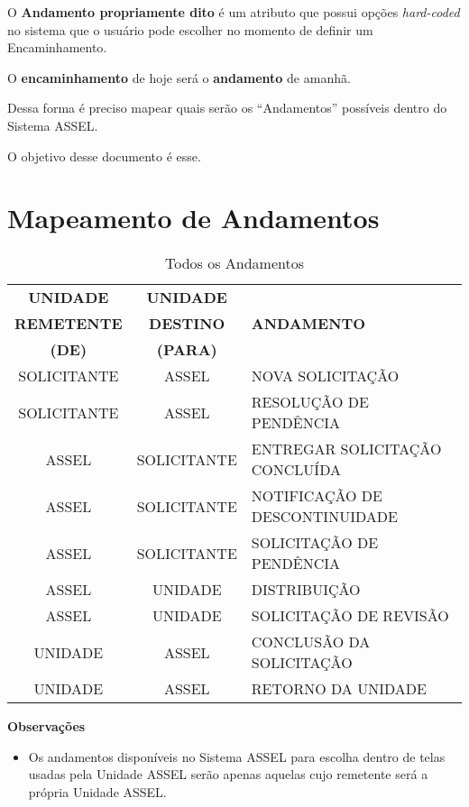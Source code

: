 O \textbf{Andamento propriamente dito} é um atributo que possui opções \emph{hard-coded} no sistema que o usuário pode escolher no momento de definir um Encaminhamento.

O \textbf{encaminhamento} de hoje será o \textbf{andamento} de amanhã.

Dessa forma é preciso mapear quais serão os ``Andamentos'' possíveis dentro do Sistema ASSEL.

O objetivo desse documento é esse.

\section{Mapeamento de Andamentos}

\begin{table}[h]
	\begin{center}
		\begin{tabular}{|c|c|p{}|}
			\hline
			\rowcolor{lightgray} \multicolumn{3}{|c|}{\Large Mapeamento de Andamentos \normalsize} \\ \hline \hline
			\rowcolor{lightgray}\textbf{UNIDADE} & \textbf{UNIDADE} &   \\ 
			\rowcolor{lightgray}\textbf{REMETENTE} & \textbf{DESTINO} & \textbf{ANDAMENTO} \\ 
			\rowcolor{lightgray}\textbf{(DE)} & \textbf{(PARA)} &  \\ \hline
			\rowcolor{corCOULD!10} SOLICITANTE & ASSEL & NOVA SOLICITAÇÃO \\ \hline
			\rowcolor{corCOULD!10} SOLICITANTE & ASSEL & RESOLUÇÃO DE PENDÊNCIA \\ \hline
			\rowcolor{corSHOULD!20} ASSEL & SOLICITANTE & ENTREGAR SOLICITAÇÃO CONCLUÍDA \\ \hline
			\rowcolor{corSHOULD!20} ASSEL & SOLICITANTE & NOTIFICAÇÃO DE DESCONTINUIDADE \\ \hline
			\rowcolor{corSHOULD!20} ASSEL & SOLICITANTE & SOLICITAÇÃO DE PENDÊNCIA \\ \hline
			\rowcolor{corSHOULD!20} ASSEL & UNIDADE & DISTRIBUIÇÃO \\ \hline
			\rowcolor{corSHOULD!20} ASSEL & UNIDADE & SOLICITAÇÃO DE REVISÃO \\ \hline			
			\rowcolor{corMUST!20} UNIDADE & ASSEL & CONCLUSÃO DA SOLICITAÇÃO \\ \hline
			\rowcolor{corMUST!20} UNIDADE & ASSEL & RETORNO DA UNIDADE \\ \hline
		\end{tabular}    
		\caption{\label{tab:mapeamento-andamentos:andamentos:todos} Todos os Andamentos}
	\end{center}
\end{table}

\textbf{Observações}

\begin{itemize}
	\item Os andamentos disponíveis no Sistema ASSEL para escolha dentro de telas usadas pela Unidade ASSEL serão apenas aquelas cujo remetente será a própria Unidade ASSEL.
\end{itemize}